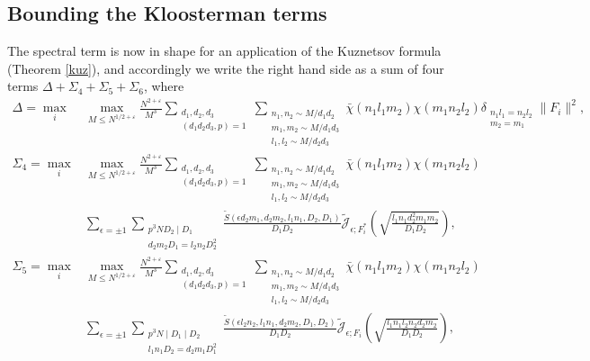 \documentclass[11pt]{amsart}
\theoremstyle{plain}
\numberwithin{equation}{section}
\theoremstyle{definition}
\renewcommand{\leq}{\leqslant}
\begin{document}
 


\subsection{Bounding the Kloosterman terms}\label{52}
 The spectral term is now in shape for an application of the Kuznetsov formula (Theorem \ref{kuz}), and accordingly we write the right hand side as a sum of four terms $\Delta + \Sigma_4 + \Sigma_5 + \Sigma_6$, where
 \begin{displaymath}
\begin{split}
 \Delta =  \max_i & \max_{M \leq N^{1/2+\varepsilon}}\frac{N^{2+\varepsilon} }{M^{3}}\sum_{\substack{d_1, d_2, d_3\\(d_1d_2d_3, p) = 1}}  \sum_{\substack{n_1, n_2 \sim M/d_1d_2\\ m_1, m_2 \sim M/d_1d_3\\ l_1, l_2 \sim M/d_2d_3}}   \bar{\chi}(n_1 l_1m_2)\chi( m_1n_2l_2 ) \delta_{\substack{n_1l_1 = n_2l_2\\ m_2= m_1}}  \| F_i\|^2,\\
\Sigma_4 =  \max_i & \max_{M \leq N^{1/2+\varepsilon}}\frac{N^{2+\varepsilon} }{M^{3}}\sum_{\substack{d_1, d_2, d_3\\(d_1d_2d_3, p) = 1}}  \sum_{\substack{n_1, n_2 \sim M/d_1d_2\\ m_1, m_2 \sim M/d_1d_3\\ l_1, l_2 \sim M/d_2d_3}}   \bar{\chi}(n_1 l_1m_2)\chi( m_1n_2l_2 ) \\
&\sum_{\epsilon  = \pm 1} \sum_{\substack{p^3N D_2 \mid D_1\\  d_2m_2 D_1= l_2n_2 D_2^2}}\frac{ \tilde{S}(\epsilon d_2m_1, d_2m_2, l_1n_1, D_2, D_1)}{D_1D_2}  \tilde{\mathcal{J}}_{\epsilon; F_i^{\ast}}\left(\sqrt{\frac{l_1n_1 d_2^2m_1 m_2}{D_1D_2}} \right),\\
\Sigma_5 =\max_i &\max_{M \leq N^{1/2+\varepsilon}}\frac{N^{2+\varepsilon} }{M^{3}}\sum_{\substack{d_1, d_2, d_3\\(d_1d_2d_3, p) = 1}}  \sum_{\substack{n_1, n_2 \sim M/d_1d_2\\ m_1, m_2 \sim M/d_1d_3\\ l_1, l_2 \sim M/d_2d_3}}   \bar{\chi}(n_1 l_1m_2)\chi( m_1n_2l_2 )\\
&\sum_{\epsilon  = \pm 1} \sum_{\substack{ p^3N \mid  D_1 \mid D_2\\ l_1n_1 D_2 = d_2m_1 D_1^2}} \frac{ \tilde{S}(\epsilon l_2n_2, l_1n_1, d_2m_2, D_1, D_2) }{D_1D_2}\tilde{\mathcal{J}}_{\epsilon; F_i}\left( \sqrt{\frac{l_1n_1 l_2n_2 d_2 m_2}{D_1D_2}}  \right), \\

\end{split}
\end{displaymath}
\end{document}
